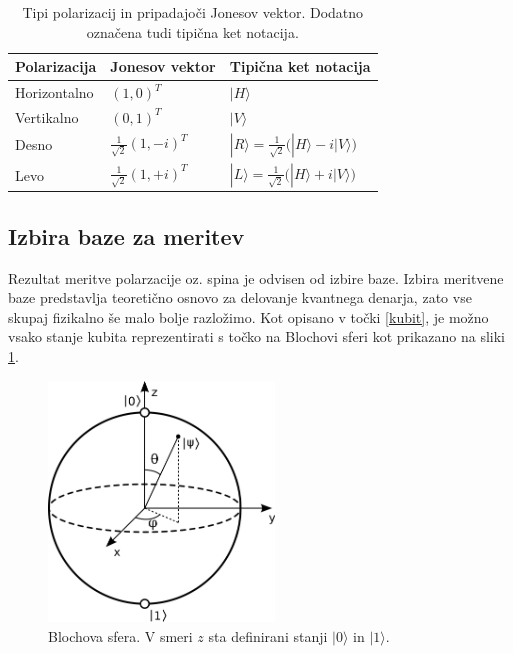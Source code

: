 \documentclass[12pt]{article}
\begin{document}
\begin{table}[h]
\centering
\renewcommand{\arraystretch}{1.5} %
\begin{tabular}{|l|l|l|}

\hline
\textbf{Polarizacija} & \textbf{Jonesov vektor}                                       & \textbf{Tipična ket notacija}                                                               \\ \hline
Horizontalno          & $ (1,0)^T $                          & $ |H\rangle $                                                                               \\ \hline
Vertikalno            & $(0,1)^T$                          & $ |V\rangle $                                                                               \\ \hline
Desno                 & ${\frac  {1}{{\sqrt  2}}}{(1, -i)^T}$ & $ { |R\rangle ={\frac {1}{\sqrt {2}}}{\big (}|H\rangle -i|V\rangle {\big )}} $ \\ \hline
Levo                  & $ {\frac  {1}{{\sqrt  2}}}{(1, +i)^T} $ & $ { |L\rangle ={\frac {1}{\sqrt {2}}}{\big (}|H\rangle +i|V\rangle {\big )}} $ \\ \hline
\end{tabular}
\caption{Tipi polarizacij in pripadajoči Jonesov vektor. Dodatno označena tudi tipična ket notacija. \cite{JonesCalculus2023} }
\label{tab:pol}
\end{table}

\subsection{Izbira baze za meritev}

\par Rezultat meritve polarzacije oz. spina je odvisen od izbire baze. Izbira meritvene baze predstavlja teoretično osnovo za delovanje kvantnega denarja, zato vse skupaj fizikalno še malo bolje razložimo. Kot opisano v točki \ref{kubit}, je možno vsako stanje kubita reprezentirati s točko na Blochovi sferi kot prikazano na sliki \ref{fig:bloch}. 

\begin{figure}[H]
\includegraphics[width=6cm]{bloch.png}
\centering
\caption{Blochova sfera. V smeri $z$ sta definirani stanji $| 0 \rangle$ in $| 1 \rangle$. \cite{BlochSphere2023}}
\label{fig:bloch}
\end{figure}
\end{document}
